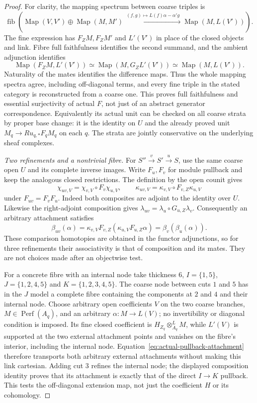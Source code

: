\documentclass[11pt]{article}
\theoremstyle{definition}
\theoremstyle{remark}
\newcommand{\Perf}{\operatorname{Perf}}
\begin{document}
\begin{proof}
For clarity, the mapping spectrum between coarse triples is
\[
 \operatorname{fib}\left(
  \operatorname{Map}(V,V')\oplus\operatorname{Map}(M,M')
  \xrightarrow{\ (f,g)\mapsto L(f)\alpha-\alpha'g\ }
  \operatorname{Map}(M,L(V'))\right).
\]
The fine expression has $F_ZM,F_ZM'$ and $L'(V')$ in place of the
closed objects and link.  Fibre full faithfulness identifies the
second summand, and the ambient adjunction identifies
\[
 \operatorname{Map}(F_ZM,L'(V'))
   \simeq\operatorname{Map}(M,G_ZL'(V'))
   \simeq\operatorname{Map}(M,L(V')).
\]
Naturality of the mates identifies the difference maps.  Thus the
whole mapping spectra agree, including off-diagonal terms, and every
fine triple in the stated category is reconstructed from a coarse
one.  This proves full faithfulness and essential surjectivity of
actual $F$, not just of an abstract generator correspondence.
Equivalently its actual unit can be checked on all coarse strata by
proper base change: it is the identity on $U$ and the already proved
unit $M_q\to Ru_{q,*}F_qM_q$ on each $q$.  The strata are jointly
conservative on the underlying sheaf complexes.

\emph{Two refinements and a nontrivial fibre.}
For $S''\xrightarrow{v}S'\xrightarrow{u}S$, use the same coarse
open $U$ and its complete inverse images.  Write $F_u,F_v$ for
module pullback and keep the analogous closed restrictions.
The definition by the open counit gives
\[
 \chi_{uv,V}=\chi_{v,V}\circ F_v\chi_{u,V},\qquad
 \kappa_{uv,V}=\kappa_{v,V}\circ F_{v,Z}\kappa_{u,V}
\]
under $F_{uv}=F_vF_u$.  Indeed both composites are adjoint to the
identity over $U$.  Likewise the right-adjoint composition gives
$\lambda_{uv}=\lambda_u\circ G_{u,Z}\lambda_v$.
Consequently an arbitrary attachment satisfies
\[
 \beta_{uv}(\alpha)=\kappa_{v,V}F_{v,Z}(\kappa_{u,V}F_{u,Z}\alpha)
                  =\beta_v(\beta_u(\alpha)).
\]
These comparison homotopies are obtained in the functor adjunctions,
so for three refinements their associativity is that of composition
and its mates.  They are not choices made after an objectwise test.

For a concrete fibre with an internal node take thickness $6$,
$I=\{1,5\}$, $J=\{1,2,4,5\}$ and $K=\{1,2,3,4,5\}$.
The coarse node between cuts $1$ and $5$ has in the $J$ model a
complete fibre containing the components at $2$ and $4$ and their
internal node.  Choose arbitrary open coefficients $V$ on the two
coarse branches, $M\in\Perf(A_q)$, and an arbitrary
$\alpha:M\to L(V)$; no invertibility or diagonal condition is imposed.
Its fine closed coefficient is $H_{Z_q}\otimes_{A_q}^LM$, while
$L'(V)$ is supported at the two external attachment points and
vanishes on the fibre's interior, including the internal node.
Equation~\eqref{eq:actual-pullback-attachment} therefore transports
both arbitrary external attachments without making this link
cartesian.  Adding cut $3$ refines the internal node; the displayed
composition identity proves that its attachment is exactly that
of the direct $I\to K$ pullback.  This tests the off-diagonal
extension map, not just the coefficient $H$ or its cohomology.


\end{proof}
\end{document}
